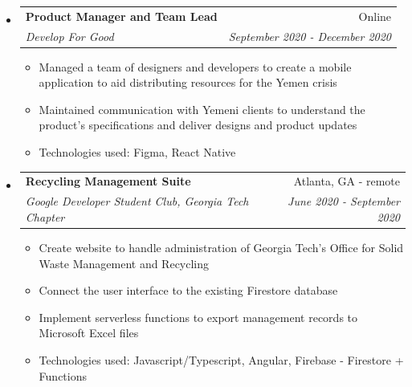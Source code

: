 \documentclass[letterpaper,11pt]{article}
\makeatletter
\newcommand{\resitem}[1]{\item #1 \vspace{-2pt}}
\newcommand{\ressubheading}[4]{
\begin{tabular*}{7.0in}{l@{\extracolsep{\fill}}r}
		\textbf{#1} & #2 \\
		\textit{#3} & \textit{#4} \\
\end{tabular*}\vspace{-6pt}}
\makeatother
\begin{document}
\begin{itemize}
\item
    \ressubheading{Product Manager and Team Lead}{Online}{Develop For Good}{September 2020 - December 2020}
    \begin{itemize}
        \resitem{Managed a team of designers and developers to create a mobile application to aid distributing resources for the Yemen crisis}
        \resitem{Maintained communication with Yemeni clients to understand the product's specifications and deliver designs and product updates}
        \resitem{Technologies used: Figma, React Native}
    \end{itemize}
\item
    \ressubheading{Recycling Management Suite}{Atlanta, GA - remote}{Google Developer Student Club, Georgia Tech Chapter}{June 2020 - September 2020}
    \begin{itemize}
        \resitem{Create website to handle administration of Georgia Tech's Office for Solid Waste Management and Recycling}
        \resitem{Connect the user interface to the existing Firestore database}
        \resitem{Implement serverless functions to export management records to Microsoft Excel files}
        \resitem{Technologies used: Javascript/Typescript, Angular, Firebase - Firestore + Functions}
    \end{itemize}

\end{itemize}
\end{document}
